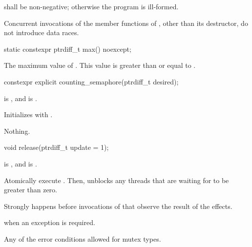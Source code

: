 \pnum
{} shall be non-negative; otherwise the program is ill-formed.

\pnum
Concurrent invocations of the member functions of ,
other than its destructor, do not introduce data races.

%
\begin{itemdecl}
static constexpr ptrdiff_t max() noexcept;
\end{itemdecl}

\begin{itemdescr}
\pnum
\returns
The maximum value of .
This value is greater than or equal to .
\end{itemdescr}

%
\begin{itemdecl}
constexpr explicit counting_semaphore(ptrdiff_t desired);
\end{itemdecl}

\begin{itemdescr}
\pnum
\expects
{} is , and
 is .

\pnum
\effects
Initializes  with .

\pnum
\throws
Nothing.
\end{itemdescr}

%
\begin{itemdecl}
void release(ptrdiff_t update = 1);
\end{itemdecl}

\begin{itemdescr}
\pnum
\expects
{} is , and
 is .

\pnum
\effects
Atomically execute .
Then, unblocks any threads
that are waiting for  to be greater than zero.

\pnum
\sync
Strongly happens before invocations of 
that observe the result of the effects.

\pnum
\throws
{} when an exception is required.

\pnum
\errors
Any of the error conditions
allowed for mutex types.
\end{itemdescr}

